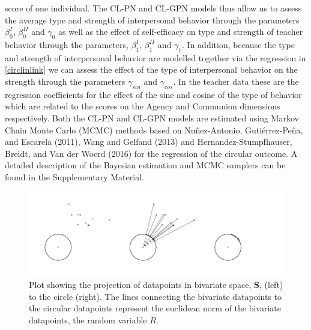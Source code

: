 \documentclass[man,mask]{apa6}
\DeclareRobustCommand{\VANDER}[3]{#2}
\begin{document}
score of one individual. The CL-PN and CL-GPN models thus allow us to assess the
average type and strength of interpersonal behavior through the parameters
\(\beta_{0}^{I}\), \(\beta_{0}^{II}\) and \(\gamma_0\) as well as the effect of
self-efficacy on type and strength of teacher behavior through the parameters,
\(\beta_{1}^{I}\), \(\beta_{1}^{II}\) and \(\gamma_1\). In addition, because the type
and strength of interpersonal behavior are modelled together via the regression
in \eqref{circlinlink} we can assess the effect of the type of interpersonal
behavior on the strength through the parameters \(\gamma_{sin}\) and
\(\gamma_{cos}\). In the teacher data these are the regression coefficients for
the effect of the sine and cosine of the type of behavior which are related to
the scores on the Agency and Communion dimensions respectively.\newline
\indent Both the CL-PN and CL-GPN models are estimated using Markov Chain Monte
Carlo (MCMC) methods based on Nuñez-Antonio, Gutiérrez-Peña, and Escarela (2011), Wang and Gelfand (2013) and
Hernandez-Stumpfhauser, Breidt, and \VANDER{Woerd}{Van der}{van der} Woerd (2016) for the regression of the circular outcome. A detailed
description of the Bayesian estimation and MCMC samplers can be found in the
Supplementary Material.

\begin{figure}
\centering
\includegraphics[width = \textwidth]{Plots/plotprojecting.pdf}
\caption{Plot showing the projection of datapoints in bivariate space, $\boldsymbol{S}$, (left) to the circle (right). The lines connecting the bivariate datapoints to the circular datapoints represent the euclidean norm of the bivariate datapoints, the random variable $R$.}
\label{projection}
\end{figure}
\end{document}
